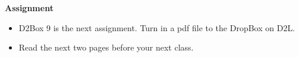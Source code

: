 
\begin{center}
  {\large\bf Assignment}
\end{center}

\begin{itemize}
\item D2Box 9 is the next assignment.  Turn in a pdf file to the
  DropBox on D2L.
\item Read the next two pages before your next class.
\end{itemize}
